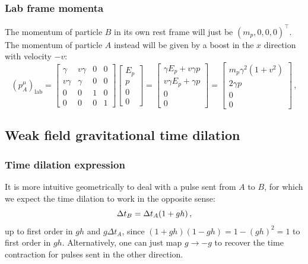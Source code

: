 \documentclass[main.tex]{subfiles}
\begin{document}
\subsubsection{Lab frame momenta}

The momentum of particle \(B\) in its own rest frame will just be \((m_p, 0, 0, 0)^\top\).
The momentum of particle \(A\) instead will be given by a boost in the \(x\) direction with velocity \(-v\):
%
\begin{equation}
  (p_A^\mu) _{\text{lab}} = 
  \left[\begin{array}{cccc}
  \gamma  & v \gamma  & 0 & 0 \\ 
  v \gamma  & \gamma  & 0 & 0 \\ 
  0 & 0 & 1 & 0 \\ 
  0 & 0 & 0 & 1
  \end{array}\right]
  \left[\begin{array}{c}
  E_p  \\ 
  p \\ 
  0 \\ 
  0
  \end{array}\right]  
  = \left[\begin{array}{c}
    \gamma E_p + v \gamma p  \\ 
    v \gamma E_p + \gamma p \\ 
    0 \\ 
    0
    \end{array}\right]  
  = \left[\begin{array}{c}
    m_p \gamma^2 (1+v^2)  \\ 
    2 \gamma p\\ 
    0 \\ 
    0
    \end{array}\right]
\,,
\end{equation}
%

\subsection{Weak field gravitational time dilation}

\subsubsection{Time dilation expression}

It is more intuitive geometrically to deal with a pulse sent from \(A\) to \(B\), for which we expect the time dilation to work in the opposite sense: 
%
\begin{equation}
  \Delta t_B = \Delta t_A \qty(1 + gh)
\,,
\end{equation}
%
up to first order in \(gh\) and \(g\Delta t_A\), since \((1+gh )(1-gh) = 1-(gh)^2 = 1\) to first order in \(gh\).
Alternatively, one can just map \(g \rightarrow -g\) to recover the time contraction for pulses sent in the other direction.
\end{document}
